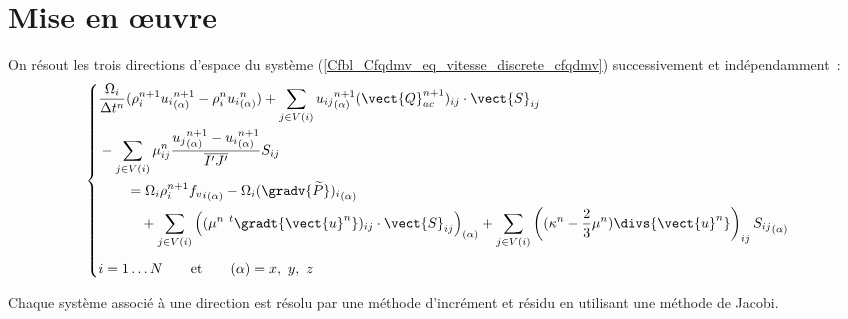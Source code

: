 \section*{Mise en \oe uvre}
On résout les trois directions d'espace du système
(\ref{Cfbl_Cfqdmv_eq_vitesse_discrete_cfqdmv}) successivement et indépendamment~:
\begin{equation}\label{Cfbl_Cfqdmv_eq_vitesse_finale_cfqdmv}
\left\{
\begin{aligned}
&\displaystyle\frac{\Omega_i}{\Delta t^n}
(\rho_i^{n+1}{u_i}_{(\alpha)}^{n+1}-\rho_i^n{u_i}_{(\alpha)}^n)
+ \displaystyle\sum\limits_{j\in V(i)}
{u_{ij}}_{(\alpha)}^{n+1}(\vect{Q}_{ac}^{n+1})_{ij}\cdot\vect{S}_{ij}\\
&- \displaystyle\sum\limits_{j\in V(i)}
\mu_{ij}^n\frac{{u_j}_{(\alpha)}^{n+1}-{u_i}_{(\alpha)}^{n+1}}{\overline{I'J'}}S_{ij}\\
&\qquad= \Omega_i\rho_i^{n+1} {{f_v}_i}_{(\alpha)}
- \Omega_i{(\gradv{\widetilde{P}})_{i}}_{(\alpha)}\\
&\qquad\quad + \displaystyle\sum\limits_{j\in V(i)}
\left((\mu^n\ ^t\gradt{\vect{u}^n})_{ij}\cdot\vect{S}_{ij}\right)_{(\alpha)}
+ \displaystyle\sum\limits_{j\in V(i)}
\left((\kappa^n-\frac{2}{3}\mu^n)
\divs{\vect{u}^n}\right)_{ij}{S_{ij}}_{(\alpha)}\\[0.5em]
&i = 1\ldots N \qquad \text{et} \qquad (\alpha) = x,\ y,\ z
\end{aligned}
\right.
\end{equation}

Chaque système associé à une direction est résolu par une méthode
d'incrément et résidu en utilisant une méthode de Jacobi.




